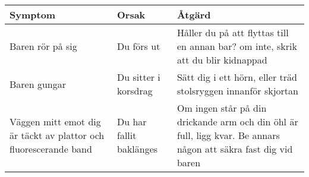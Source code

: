 \begin{adjustbox}{angle=-90}
  \begin{tabular}{|p{0.3\textheight}|p{0.3\textheight}|p{0.3\textheight}|}
    \hline
    \textbf{Symptom}                                                & \textbf{Orsak} & \textbf{Åtgärd}              \\
    \hline
    Baren rör på sig                                                &
    Du förs ut                                                      &
    Håller du på att flyttas till en annan bar? om inte, skrik att du blir kidnappad                                \\
    \hline
    Baren gungar                                                    &
    Du sitter i korsdrag                                            &
    Sätt dig i ett hörn, eller träd stolsryggen innanför skjortan                                                   \\
    \hline
    Väggen mitt emot dig är täckt av plattor och fluorescerande band &
    Du har fallit baklänges                                         &
    Om ingen står på din drickande arm och din öhl är full, ligg kvar. Be annars någon att säkra fast dig vid baren \\
    \hline
  \end{tabular}
\end{adjustbox}


